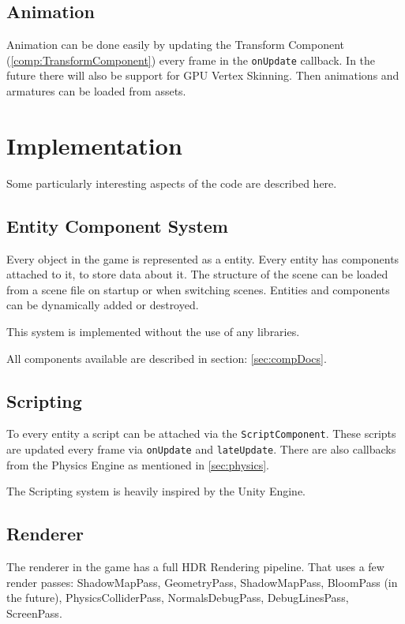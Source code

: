\documentclass{article}
\begin{document}
\subsection{Animation}

Animation can be done easily by updating the Transform Component (\ref{comp:TransformComponent}) every frame in the \verb|onUpdate| callback. In the future there will also be support for GPU Vertex Skinning. Then animations and armatures can be loaded from assets.

\section{Implementation}

Some particularly interesting aspects of the code are described here.

\subsection{Entity Component System}

Every object in the game is represented as a entity. Every entity has components attached to it, to store data about it. The structure of the scene can be loaded from a scene file on startup or when switching scenes. Entities and components can be dynamically added or destroyed.

This system is implemented without the use of any libraries.

All components available are described in section: \ref{sec:compDocs}.

\subsection{Scripting}

To every entity a script can be attached via the \verb|ScriptComponent|. These scripts are updated every frame via \verb|onUpdate| and \verb|lateUpdate|. There are also callbacks from the Physics Engine as mentioned in \ref{sec:physics}.

The Scripting system is heavily inspired by the Unity Engine.

\subsection{Renderer}

The renderer in the game has a full HDR Rendering pipeline. That uses a few render passes: ShadowMapPass, GeometryPass, ShadowMapPass, BloomPass (in the future), PhysicsColliderPass, NormalsDebugPass, DebugLinesPass, ScreenPass.
\end{document}
